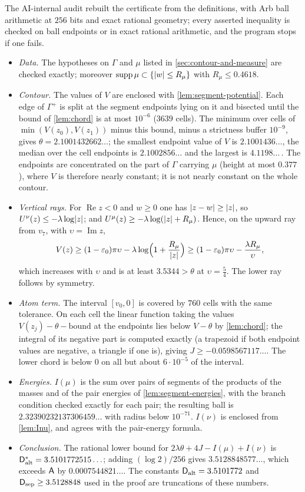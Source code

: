 The AI-internal audit rebuilt the certificate from the definitions, with Arb ball arithmetic at
$256$ bits and exact rational geometry; every asserted inequality is checked on ball endpoints or
in exact rational arithmetic, and the program stops if one fails.
\begin{itemize}
  \item \emph{Data.} The hypotheses on $\Gamma$ and $\mu$ listed in \cref{sec:contour-and-measure}
  are checked exactly; moreover $\operatorname{supp}\mu\subset\{\lvert w\rvert\le R_\mu\}$ with
  $R_\mu\le0.4618$.
  \item \emph{Contour.} The values of $V$ are enclosed with \cref{lem:segment-potential}. Each
  edge of $\Gamma^+$ is split at the segment endpoints lying on it and bisected until the bound of
  \cref{lem:chord} is at most $10^{-6}$ ($3639$ cells). The minimum over cells of
  $\min(V(z_0),V(z_1))$ minus this bound, minus a strictness buffer $10^{-9}$, gives
  $\theta=2.1001432662\ldots$; the smallest endpoint value of $V$ is $2.1001436\ldots$, the median
  over the cell endpoints is $2.1002856\ldots$ and the largest is $4.1198\ldots$\,. The endpoints
  are concentrated on the part of $\Gamma$ carrying $\mu$ (height at most $0.377$), where $V$ is
  therefore nearly constant; it is not nearly constant on the whole contour.
  \item \emph{Vertical rays.} For $\operatorname{Re}z<0$ and $w\ge0$ one has $\lvert z-w\rvert\ge\lvert z\rvert$,
  so $U^{\nu}(z)\le-\lambda\log\lvert z\rvert$; and $U^{\mu}(z)\ge-\lambda\log(\lvert z\rvert+R_\mu)$. Hence, on the
  upward ray from $v_7$, with $\upsilon=\operatorname{Im}z$,
  \[
    V(z)\ge(1-\varepsilon_0)\pi\upsilon-\lambda\log\Bigl(1+\frac{R_\mu}{\lvert z\rvert}\Bigr)
    \ge(1-\varepsilon_0)\pi\upsilon-\frac{\lambda R_\mu}\upsilon ,
  \]
  which increases with $\upsilon$ and is at least $3.5344>\theta$ at $\upsilon=\frac54$. The lower ray follows
  by symmetry.
  \item \emph{Atom term.} The interval $[v_0,0]$ is covered by $760$ cells with the same
  tolerance. On each cell the linear function taking the values
  $V(z_j)-\theta-\text{bound}$ at the endpoints lies below $V-\theta$ by \cref{lem:chord}; the
  integral of its negative part is computed exactly (a trapezoid if both endpoint values are
  negative, a triangle if one is), giving $J\ge-0.0598567117\ldots$. The lower chord is below
  $0$ on all but about $6\cdot10^{-5}$ of the interval.
  \item \emph{Energies.} $I(\mu)$ is the sum over pairs of segments of the products of the masses
  and of the pair energies of \cref{lem:segment-energies}, with the branch condition checked
  exactly for each pair; the resulting ball is $2.32390232137306459\ldots$ with radius below
  $10^{-71}$. $I(\nu)$ is enclosed from \cref{lem:Inu}, and agrees with the pair-energy formula.
  \item \emph{Conclusion.} The rational lower bound for $2\lambda\theta+4J-I(\mu)+I(\nu)$ is
  $\mathsf{D}^{*}_{\mathrm{alt}}=3.5101772515\ldots$; adding $(\log2)/256$ gives $3.5128848577\ldots$, which exceeds
  $\mathsf{A}$ by $0.0007544821\ldots$. The constants $\mathsf{D}_{\mathrm{alt}}=3.5101772$ and
  $\mathsf{D}_{\mathrm{sep}}\ge3.5128848$ used in the proof are truncations of these numbers.
\end{itemize}

